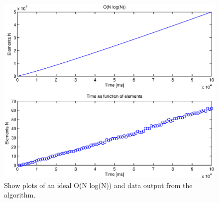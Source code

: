 \begin{figure}[th!]
\centering
\includegraphics[width=1\textwidth]{./graphics/test2.eps}
\caption{Show plots of an ideal O(N log(N)) and data output from the algorithm.}
\label{fig:test2}
\end{figure}
